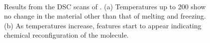 \begin{figure}[tbp]
	\centering
	\\
	\caption[DSC Results of \TMHD{}]%
		{Results from the DSC scans of \TMHD{}. (a) Temperatures up to 200\degC{} show no change in the %
		material other than that of melting and freezing. (b) As temperatures increase, features start to appear %
		indicating chemical reconfiguration of the molecule.}
	\label{fig:DSC-TMHD}
\end{figure}
\clearpage

